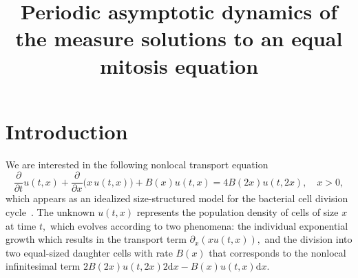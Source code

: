\documentclass[AHL,Unicode,longabstracts,published]{cedram}
\title[Periodic asymptotic dynamics of the measure solutions to an equal mitosis equation]{Periodic asymptotic dynamics of the measure solutions to an equal mitosis equation}
\author[\initial{P.} \lastname{Gabriel}]{\firstname{Pierre} \lastname{Gabriel}}
\author[\initial{H.} \lastname{Martin}]{\firstname{Hugo} \lastname{Martin}}
\newcommand{\p}{\partial}
\newcommand{\ddt}{\frac{\p}{\p t}}
\newcommand{\ddx}{\frac{\p}{\p x}}
\newcommand{\1}{\mathds{1}}
\renewcommand{\d}{\mathrm{d}}
\begin{document}
\maketitle

\section{Introduction}

We are interested in the following nonlocal transport equation
\begin{equation}\label{eq:mitosis}
\ddt u(t,x) + \ddx \big(x\,u(t,x)\big) + B(x)u(t,x) = 4B(2x)u(t,2x),\quad x>0,
\end{equation}
which appears as an idealized size-structured model for the bacterial cell division cycle~\cite{BellAnderson,SinkoStreifer71}. The unknown $u(t,x)$ represents the population density of cells of size $x$ at time $t,$ which evolves according to two phenomena: the individual exponential growth which results in the transport term $\partial_x(xu(t,x)),$ and the division into two equal-sized daughter cells with rate $B(x)$ that corresponds to the nonlocal infinitesimal term $2B(2x)u(t,2x)2\d x-B(x)u(t,x)\d x$.
\end{document}
